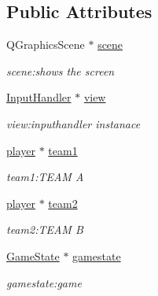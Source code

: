 \subsection*{Public Attributes}
\begin{DoxyCompactItemize}
\item 
Q\+Graphics\+Scene $\ast$ \hyperlink{class_game_a8119e3b9a632906c6808fa294b46a92a}{scene}\hypertarget{class_game_a8119e3b9a632906c6808fa294b46a92a}{}\label{class_game_a8119e3b9a632906c6808fa294b46a92a}

\begin{DoxyCompactList}\small\item\em scene\+:shows the screen \end{DoxyCompactList}\item 
\hyperlink{class_input_handler}{Input\+Handler} $\ast$ \hyperlink{class_game_a46875cc606e2c3edd004dec97abfd0dc}{view}\hypertarget{class_game_a46875cc606e2c3edd004dec97abfd0dc}{}\label{class_game_a46875cc606e2c3edd004dec97abfd0dc}

\begin{DoxyCompactList}\small\item\em view\+:inputhandler instanace \end{DoxyCompactList}\item 
\hyperlink{classplayer}{player} $\ast$ \hyperlink{class_game_a0536a6d3eeb768b96bc18178236f44a6}{team1}\hypertarget{class_game_a0536a6d3eeb768b96bc18178236f44a6}{}\label{class_game_a0536a6d3eeb768b96bc18178236f44a6}

\begin{DoxyCompactList}\small\item\em team1\+:T\+E\+AM A \end{DoxyCompactList}\item 
\hyperlink{classplayer}{player} $\ast$ \hyperlink{class_game_a02438e15c1b6409a329b9ba81984ad89}{team2}\hypertarget{class_game_a02438e15c1b6409a329b9ba81984ad89}{}\label{class_game_a02438e15c1b6409a329b9ba81984ad89}

\begin{DoxyCompactList}\small\item\em team2\+:T\+E\+AM B \end{DoxyCompactList}\item 
\hyperlink{class_game_state}{Game\+State} $\ast$ \hyperlink{class_game_afadfcefd31c17fe01772276561ee91f2}{gamestate}\hypertarget{class_game_afadfcefd31c17fe01772276561ee91f2}{}\label{class_game_afadfcefd31c17fe01772276561ee91f2}

\begin{DoxyCompactList}\small\item\em gamestate\+:game \end{DoxyCompactList}\end{DoxyCompactItemize}


